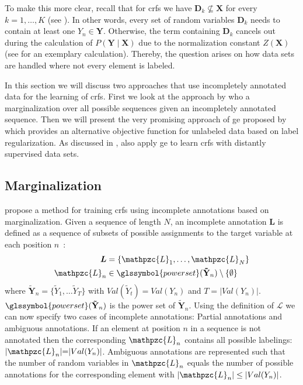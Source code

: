 To make this more clear, recall that for \glspl{crf} we have $\mathbf{D}_k\not\subseteq\mathbf{X}$ for every $k=1,\dots,K$ (see ).
In other words, every set of \glspl{random variable} $\mathbf{D}_k$ needs to contain at least one $Y_n\in\mathbf{Y}$.
Otherwise, the term containing $\mathbf{D}_k$ cancels out during the calculation of $P(\mathbf{Y}\mid\mathbf{X})$ due to the normalization constant $Z(\mathbf{X})$ (see  for an exemplary calculation).
Thereby, the question arises on how data sets are handled where not every element is labeled.

In this section we will discuss two approaches that use incompletely annotated data for the learning of \glspl{crf}.
First we look at the approach by \citet{tsuboi2008training} who a marginalization over all possible sequences given an incompletely annotated sequence.
Then we will present the very promising approach of \acrfull{ge} proposed by \citet{mann2007simple} which provides an alternative \gls{objective function} for unlabeled data based on \gls{label regularization}.
As discussed in , \citet{lu2013web} also apply \gls{ge} to learn \glspl{crf} with distantly supervised data sets.

\subsection{Marginalization}

\citet{tsuboi2008training} propose a method for training \glspl{crf} using incomplete annotations based on marginalization.
Given a sequence of length $N$, an incomplete annotation $\bm{L}$ is defined as a sequence of subsets of possible assignments to the \gls{target variable} at each position $n$~\citep{tsuboi2008training}:
\begin{equation}
  \label{equ:incomplete-annotation}
  \begin{split}
    \bm{L}&= \left\{\mathpzc{L}_1,\dots,\mathpzc{L}_N\right\}\\
    \mathpzc{L}_n&\in\glssymbol{power set}(\mathbf{\tilde{Y}}_n)\setminus \{\emptyset\}
  \end{split}
\end{equation}
where $\mathbf{\tilde{Y}}_n{=}\{\tilde{Y}_1,\dots\tilde{Y}_T\}$ with $Val(\tilde{Y}_t){=}Val(Y_n)$ and $T{=}|Val(Y_n)|$.
$\glssymbol{power set}(\mathbf{\tilde{Y}}_n)$ is the \gls{power set} of $\mathbf{\tilde{Y}}_n$.
Using the definition of $\mathcal{L}$ we can now specify two cases of incomplete annotations: Partial annotations and ambiguous annotations.
If an element at position $n$ in a sequence is not annotated then the corresponding $\mathpzc{L}_n$ contains all possible labelings: $|\mathpzc{L}_n|{=}|Val(Y_n)|$.
Ambiguous annotations are represented such that the number of \glspl{random variable} in $\mathpzc{L}_n$ equals the number of possible annotations for the corresponding element with $|\mathpzc{L}_n|\leq |Val(Y_n)|$.

